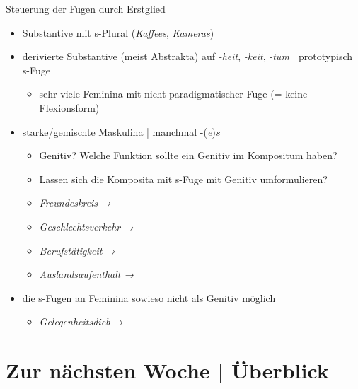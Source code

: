 \begin{frame}
  {Steuerung der Fugen durch Erstglied}
  \onslide<+->
  \begin{itemize}[<+->]
    \item Substantive mit s-Plural (\textit{Kaffees}, \textit{Kameras}) 
      \Halbzeile
    \item \alert{derivierte} Substantive (meist Abstrakta) auf \textit{-heit}, \textit{-keit}, \textit{-tum} |  \alert{prototypisch s-Fuge}
      \begin{itemize}[<+->]
        \item sehr viele Feminina mit nicht paradigmatischer Fuge (= keine Flexionsform)
      \end{itemize}
      \Halbzeile
    \item starke\slash gemischte Maskulina | manchmal -(\textit{e})\textit{s}
      \begin{itemize}[<+->]
        \item Genitiv? Welche Funktion sollte ein Genitiv im Kompositum haben?
        \item Lassen sich die Komposita mit s-Fuge mit Genitiv umformulieren?
        \item \textit{Freundeskreis → }
        \item \textit{Geschlechtsverkehr → }
        \item \textit{Berufstätigkeit → }
        \item \textit{Auslandsaufenthalt → }
      \end{itemize}
    \Halbzeile
  \item die s-Fugen an \alert{Feminina} sowieso nicht als Genitiv möglich
      \begin{itemize}
        \item \textit{Gelegenheitsdieb} → 
      \end{itemize}
  \end{itemize}
\end{frame}

\ifdefined\TITLE
  \section{Zur nächsten Woche | Überblick}

